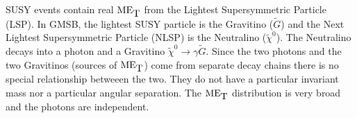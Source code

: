 SUSY events contain real $\mbox{ME}_{\mbox{T}}$ from the Lightest Supersymmetric Particle (LSP).
In GMSB, the lightest SUSY particle is the Gravitino ($\tilde{G}$) and the Next
Lightest Supersymmetric Particle (NLSP) is the Neutralino ($\tilde{\chi}^{0}$).
The Neutralino decays into a photon and a Gravitino $\tilde{\chi}^{0}\rightarrow
\gamma\tilde{G}$. Since the two photons and the two Gravitinos (sources of 
$\mbox{ME}_{\mbox{T}}$) come from separate decay chains there is no special relationship
betweeen the two. They do not have a particular invariant mass nor a particular
angular separation. The $\mbox{ME}_{\mbox{T}}$ distribution is very broad and the photons are
independent.


